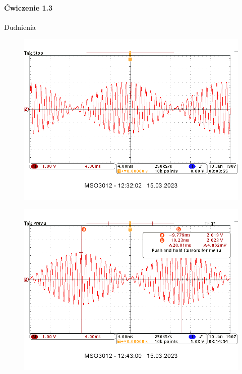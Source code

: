 \documentclass[14pt, table]{extarticle}
\begin{document}
\paragraph{Ćwiczenie 1.3 \\}
Dudnienia 
\begin{figure}[H]
\includegraphics[scale=0.7]{A0}
\centering
\end{figure}

\begin{figure}[H]
\includegraphics[scale=0.7]{A2}
\centering
\end{figure}
\end{document}
